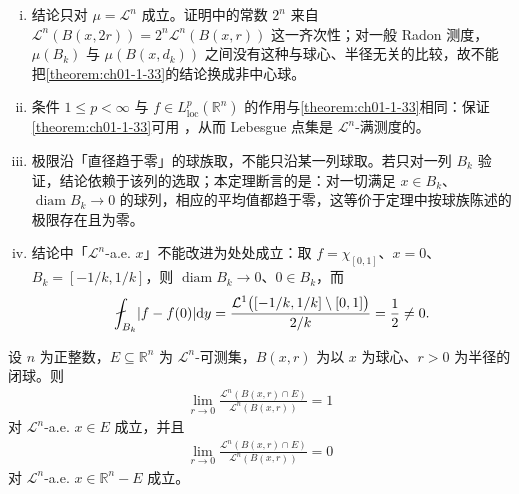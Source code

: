 \documentclass[../../main.tex]{subfiles}%
\begin{document}
\begin{remark}\label{remark:ch01-thm-1-34-条件}
\begin{enumerate}[(i)]
\item 结论只对 $\mu=\mathcal{L}^{n}$ 成立。证明中的常数 $2^{n}$ 来自 $\mathcal{L}^{n}(B(x,2r))=2^{n}\mathcal{L}^{n}(B(x,r))$ 这一齐次性；对一般 Radon 测度，$\mu(B_k)$ 与 $\mu(B(x,d_k))$ 之间没有这种与球心、半径无关的比较，故不能把\cref{theorem:ch01-1-33}的结论换成非中心球。%
\item 条件 $1\leqslant p<\infty$ 与 $f\in L^{p}_{\mathrm{loc}}(\mathbb{R}^n)$ 的作用与\cref{theorem:ch01-1-33}相同：保证\cref{theorem:ch01-1-33}可用 ，从而 Lebesgue 点集是 $\mathcal{L}^{n}$-满测度的。%
\item 极限沿「直径趋于零」的球族取，不能只沿某一列球取。若只对一列 $B_k$ 验证，结论依赖于该列的选取；本定理断言的是：对一切满足 $x\in B_k$、$\operatorname{diam}B_k\to0$ 的球列，相应的平均值都趋于零，这等价于定理中按球族陈述的极限存在且为零。
\item 结论中「$\mathcal{L}^{n}$-a.e. $x$」不能改进为处处成立：取 $f=\chi_{[0,1]}$、$x=0$、$B_k=[-1/k,1/k]$，则 $\operatorname{diam}B_k\to0$、$0\in B_k$，而
\begin{align*}
\fint_{B_k}\lvert f-f(0)\rvert\diff y=\frac{\mathcal{L}^{1}\bigl([-1/k,1/k]\setminus[0,1]\bigr)}{2/k}=\frac{1}{2}\neq0 .
\end{align*}
\end{enumerate}
\end{remark}

\begin{theorem}[密度 1 点与密度 0 点]\label{theorem:ch01-1-35}
设 $n$ 为正整数，$E\subseteq\mathbb{R}^n$ 为 $\mathcal{L}^{n}$-可测集，$B(x,r)$ 为以 $x$ 为球心、$r>0$ 为半径的闭球。则
\begin{align*}
\lim_{r\to0}\frac{\mathcal{L}^{n}(B(x,r)\cap E)}{\mathcal{L}^{n}(B(x,r))}=1
\end{align*}
对 $\mathcal{L}^{n}$-a.e. $x\in E$ 成立，并且
\begin{align*}
\lim_{r\to0}\frac{\mathcal{L}^{n}(B(x,r)\cap E)}{\mathcal{L}^{n}(B(x,r))}=0
\end{align*}
对 $\mathcal{L}^{n}$-a.e. $x\in\mathbb{R}^n-E$ 成立。
\end{theorem}
\end{document}
